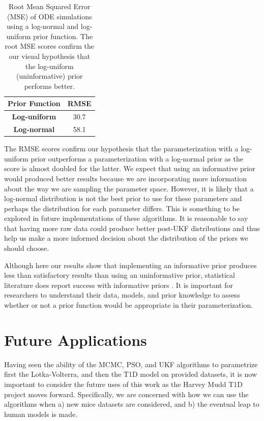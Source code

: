\documentclass{article}
\begin{document}
\begin{table}[H]
  \begin{center}
    \label{tab:table1}
    \begin{tabular}{c|c} 
      \textbf{Prior Function} & \textbf{RMSE} \\
      \hline
      \textbf{Log-uniform} & 30.7\\
      \textbf{Log-normal} & 58.1\\
    \end{tabular}
    \caption{Root Mean Squared Error (MSE) of ODE simulations using a log-normal and log-uniform prior function. The root MSE scores confirm the our visual hypothesis that the log-uniform (uninformative) prior performs better.}
  \end{center}
\end{table}
The RMSE scores confirm our hypothesis that the parameterization with a log-uniform prior outperforms a parameterization with a log-normal prior as the score is almost doubled for the latter. We expect that using an informative prior would produced better results because we are incorporating more information about the way we are sampling the parameter space. However, it is likely that a log-normal distribution is not the best prior to use for these parameters and perhaps the distribution for each parameter differs. This is something to be explored in future implementations of these algorithms. It is reasonable to say that having more raw data could produce better post-UKF distributions and thus help us make a more informed decision about the distribution of the priors we should choose.
\par Although here our results show that implementing an informative prior produces less than satisfactory results than using an uninformative prior, statistical literature does report success with informative priors \cite{golchi_priors}. It is important for researchers to understand their data, models, and prior knowledge to assess whether or not a prior function would be appropriate in their parameterization.


\section{Future Applications}
Having seen the ability of the MCMC, PSO, and UKF algorithms to parametrize first the Lotka-Volterra, and then the T1D model on provided datasets, it is now important to consider the future uses of this work as the Harvey Mudd T1D project moves forward. Specifically, we are concerned with how we can use the algorithms when a) new mice datasets are considered, and b) the eventual leap to human models is made.
\end{document}
